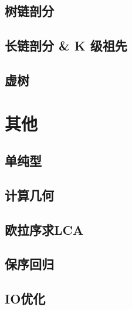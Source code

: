 \documentclass[a4paper,12pt]{article}
\begin{document}
\subsection{树链剖分}

\subsection{长链剖分 \& K 级祖先}

\subsection{虚树}


\section{其他}

\subsection{单纯型}

\subsection{计算几何}

\subsection{欧拉序求LCA}

\subsection{保序回归}

\subsection{IO优化}



\label{LastPage}
\end{document}
